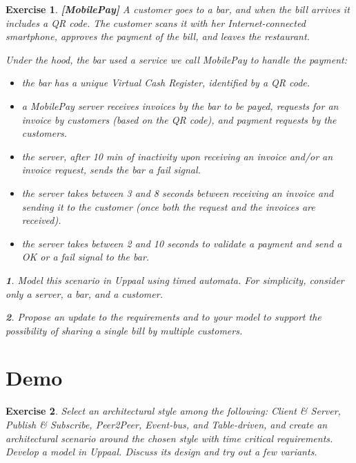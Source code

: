 \documentclass[11pt]{article}
\theoremstyle{myplain}
\newtheorem{exercise}{Exercise}
\theoremstyle{definition} %
\newtheorem{subexercise}{}[exercise]
\newcommand{\subex}[1]{\begin{subexercise}#1\end{subexercise}}
\begin{document}
\begin{exercise} \label{ex:vm2}
\textbf{[MobilePay]}
A customer goes to a bar, and when the bill arrives it includes a QR code. The customer scans it with her Internet-connected smartphone, approves the payment of the bill, and leaves the restaurant.

Under the hood, the bar used a service we call \emph{MobilePay} to handle the payment: %
\begin{itemize}
  \setlength\itemsep{0.3mm}
  \item the bar has a unique Virtual Cash Register, identified by a QR code.
  \item a MobilePay server receives invoices by the bar to be payed, requests for an invoice by customers (based on the QR code), and payment requests by the customers.
  \item the server, after 10 min of inactivity upon receiving an invoice and/or an invoice request, sends the bar a fail signal.
  \item the server takes between 3 and 8 seconds between receiving an invoice and sending it to the customer (once both the request and the invoices are received).
  \item the server takes between 2 and 10 seconds to validate a payment and send a OK or a fail signal to the bar.
\end{itemize}

\subex{Model this scenario in Uppaal using timed automata. For simplicity, consider only a server, a bar, and a customer.}

\subex{Propose an update to the requirements and to your model to support the possibility of sharing a single bill by multiple customers.}



\end{exercise}

\section*{Demo}


\begin{exercise}  
Select an architectural style among the following: \emph{Client \& Server}, \emph{Publish \& Subscribe}, \emph{Peer2Peer}, \emph{Event-bus}, and \emph{Table-driven}, and create an architectural scenario around the chosen style with time critical requirements. Develop a model in Uppaal. Discuss its design and try out a few variants.
\end{exercise}


 
\end{document}
